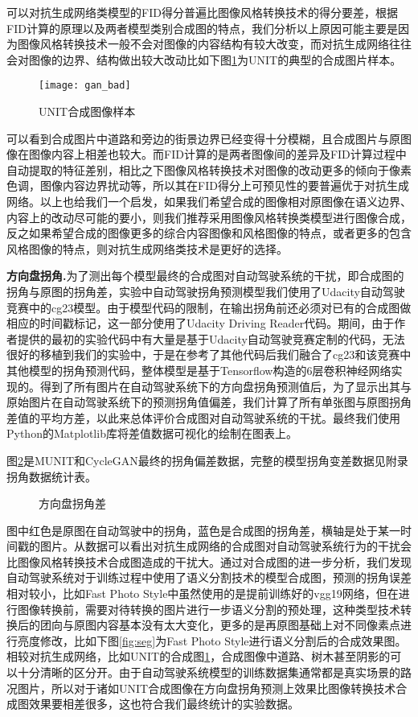 可以对抗生成网络类模型的FID得分普遍比图像风格转换技术的得分要差，根据FID计算的原理以及两者模型类别合成图的特点，我们分析以上原因可能主要是因为图像风格转换技术一般不会对图像的内容结构有较大改变，而对抗生成网络往往会对图像的边界、结构做出较大改动比如下图\ref{fig:gan}为UNIT的典型的合成图片样本。
\begin{figure}[h]
    \centering
    \texttt{[image: gan\_bad]}
    \caption{UNIT合成图像样本}
    \label{fig:gan}
\end{figure}
可以看到合成图片中道路和旁边的街景边界已经变得十分模糊，且合成图片与原图像在图像内容上相差也较大。而FID计算的是两者图像间的差异及FID计算过程中自动提取的特征差别，相比之下图像风格转换技术对图像的改动更多的倾向于像素色调，图像内容边界扰动等，所以其在FID得分上可预见性的要普遍优于对抗生成网络。以上也给我们一个启发，如果我们希望合成的图像相对原图像在语义边界、内容上的改动尽可能的要小，则我们推荐采用图像风格转换类模型进行图像合成，反之如果希望合成的图像更多的综合内容图像和风格图像的特点，或者更多的包含风格图像的特点，则对抗生成网络类技术是更好的选择。 

\textbf{方向盘拐角.}\quad 为了测出每个模型最终的合成图对自动驾驶系统的干扰，即合成图的拐角与原图的拐角差，实验中自动驾驶拐角预测模型我们使用了Udacity自动驾驶竞赛中的cg23\cite{cg23}模型。由于模型代码的限制，在输出拐角前还必须对已有的合成图做相应的时间戳标记，这一部分使用了Udacity Driving Reader代码\cite{git:udr}。期间，由于作者提供的最初的实验代码中有大量是基于Udacity自动驾驶竞赛定制的代码，无法很好的移植到我们的实验中，于是在参考了其他代码后我们融合了cg23和该竞赛中其他模型的拐角预测代码，整体模型是基于Tensorflow构造的6层卷积神经网络实现的。得到了所有图片在自动驾驶系统下的方向盘拐角预测值后，为了显示出其与原始图片在自动驾驶系统下的预测拐角值偏差，我们计算了所有单张图与原图拐角差值的平均方差，以此来总体评价合成图对自动驾驶系统的干扰。最终我们使用Python的Matplotlib库将差值数据可视化的绘制在图表上。

图\ref{fig:sad}是MUNIT和CycleGAN最终的拐角偏差数据，完整的模型拐角变差数据见附录拐角数据统计表。
\begin{figure}[!h]
    \caption{方向盘拐角差}
    \label{fig:sad}
\end{figure}


图中红色是原图在自动驾驶中的拐角，蓝色是合成图的拐角差，横轴是处于某一时间戳的图片。从数据可以看出对抗生成网络的合成图对自动驾驶系统行为的干扰会比图像风格转换技术合成图造成的干扰大。通过对合成图的进一步分析，我们发现自动驾驶系统对于训练过程中使用了语义分割技术的模型合成图，预测的拐角误差相对较小，比如Fast Photo Style中虽然使用的是提前训练好的vgg19网络，但在进行图像转换前，需要对待转换的图片进行一步语义分割的预处理，这种类型技术转换后的团向与原图内容基本没有太大变化，更多的是再原图基础上对不同像素点进行亮度修改，比如下图\ref{fig:seg}为Fast Photo Style进行语义分割后的合成效果图。相较对抗生成网络，比如UNIT的合成图\ref{fig:gan}，合成图像中道路、树木甚至阴影的可以十分清晰的区分开。由于自动驾驶系统模型的训练数据集通常都是真实场景的路况图片，所以对于诸如UNIT合成图像在方向盘拐角预测上效果比图像转换技术合成图效果要相差很多，这也符合我们最终统计的实验数据。

